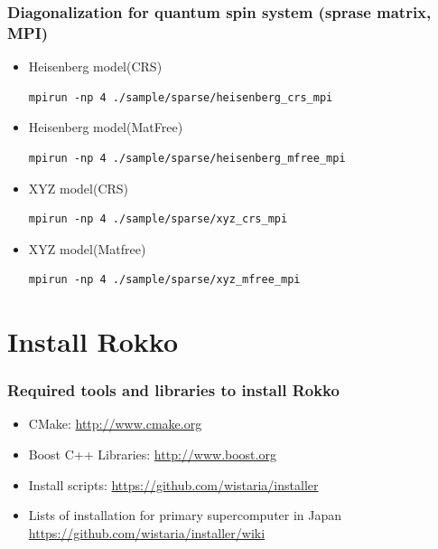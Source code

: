 \begin{frame}[c,fragile]
  \frametitle{Diagonalization for quantum spin system (sprase matrix, MPI)}
  \begin{itemize}
  \item Heisenberg model(CRS) 
\begin{lstlisting}[style=shstyle]
mpirun -np 4 ./sample/sparse/heisenberg_crs_mpi
\end{lstlisting}
  \item Heisenberg model(MatFree) 
\begin{lstlisting}[style=shstyle]
mpirun -np 4 ./sample/sparse/heisenberg_mfree_mpi
\end{lstlisting}
  \item XYZ model(CRS) 
\begin{lstlisting}[style=shstyle]
mpirun -np 4 ./sample/sparse/xyz_crs_mpi
\end{lstlisting}
  \item XYZ model(Matfree) 
\begin{lstlisting}[style=shstyle]
mpirun -np 4 ./sample/sparse/xyz_mfree_mpi
\end{lstlisting}
  \end{itemize}
\end{frame}


\section{Install Rokko}

\begin{frame}
  \frametitle{Required tools and libraries to install Rokko}
  \begin{itemize}
    \setlength{\itemsep}{1em}
  \item CMake: \url{http://www.cmake.org}
  \item Boost C++ Libraries: \url{http://www.boost.org}
  \item Install scripts: \url{https://github.com/wistaria/installer}
  \item Lists of installation for primary supercomputer in Japan \\
    \url{https://github.com/wistaria/installer/wiki}
  \end{itemize}
\end{frame}


